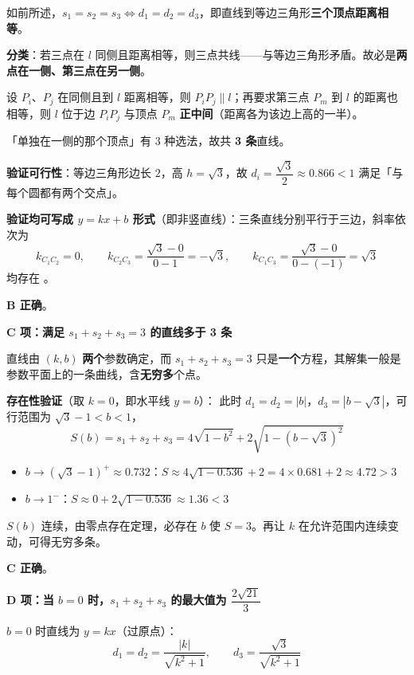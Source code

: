 如前所述，$s_1=s_2=s_3\iff d_1=d_2=d_3$，即直线到等边三角形\textbf{三个顶点距离相等}。

\textbf{分类}：若三点在 $l$ 同侧且距离相等，则三点共线——与等边三角形矛盾。故必是\textbf{两点在一侧、第三点在另一侧}。

设 $P_i$、$P_j$ 在同侧且到 $l$ 距离相等，则 $P_iP_j\parallel l$；再要求第三点 $P_m$ 到 $l$ 的距离也相等，则 $l$ 位于边 $P_iP_j$ 与顶点 $P_m$ \textbf{正中间}（距离各为该边上高的一半）。

「单独在一侧的那个顶点」有 $3$ 种选法，故共 \textbf{3 条}直线。

\textbf{验证可行性}：等边三角形边长 $2$，高 $h=\sqrt3$，故 $d_i=\dfrac{\sqrt3}{2}\approx0.866<1$  满足「与每个圆都有两个交点」。

\textbf{验证均可写成 $y=kx+b$ 形式}（即非竖直线）：三条直线分别平行于三边，斜率依次为
\[k_{C_1C_2}=0,\qquad k_{C_2C_3}=\frac{\sqrt3-0}{0-1}=-\sqrt3,\qquad k_{C_1C_3}=\frac{\sqrt3-0}{0-(-1)}=\sqrt3\]
均存在 。

 \textbf{B 正确}。

\par\medskip

\textbf{C 项：满足 $s_1+s_2+s_3=3$ 的直线多于 3 条}

直线由 $(k,b)$ \textbf{两个}参数确定，而 $s_1+s_2+s_3=3$ 只是\textbf{一个}方程，其解集一般是参数平面上的一条曲线，含\textbf{无穷多}个点。

\textbf{存在性验证}（取 $k=0$，即水平线 $y=b$）：
此时 $d_1=d_2=|b|$，$d_3=|b-\sqrt3|$，可行范围为 $\sqrt3-1<b<1$，
\[S(b)=s_1+s_2+s_3=4\sqrt{1-b^2}+2\sqrt{1-(b-\sqrt3)^2}\]

\begin{itemize}
\item $b\to(\sqrt3-1)^{+}\approx0.732$：$S\approx 4\sqrt{1-0.536}+2=4\times0.681+2\approx4.72>3$
\item $b\to 1^{-}$：$S\approx 0+2\sqrt{1-0.536}\approx1.36<3$
\end{itemize}

$S(b)$ 连续，由零点存在定理，必存在 $b$ 使 $S=3$。再让 $k$ 在允许范围内连续变动，可得无穷多条。

 \textbf{C 正确}。

\par\medskip

\textbf{D 项：当 $b=0$ 时，$s_1+s_2+s_3$ 的最大值为 $\dfrac{2\sqrt{21}}{3}$}

$b=0$ 时直线为 $y=kx$（过原点）：
\[d_1=d_2=\frac{|k|}{\sqrt{k^2+1}},\qquad d_3=\frac{\sqrt3}{\sqrt{k^2+1}}\]

